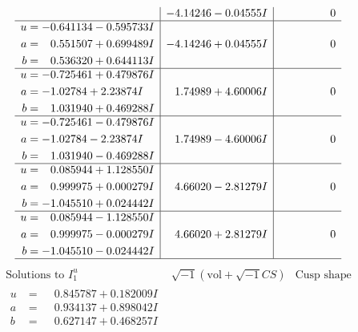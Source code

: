 \documentclass[1p]{elsarticle_modified}
\theoremstyle{definition}
\newcommand{\I}{\sqrt{-1}}
\begin{document}
$$\begin{array}{c|c|c}
 & -4.14246 - 0.04555 I & \phantom{-0.000000 } 0 \\ \hline\begin{aligned}
u &= -0.641134 - 0.595733 I \\
a &= \phantom{-}0.551507 + 0.699489 I \\
b &= \phantom{-}0.536320 + 0.644113 I\end{aligned}
 & -4.14246 + 0.04555 I & \phantom{-0.000000 } 0 \\ \hline\begin{aligned}
u &= -0.725461 + 0.479876 I \\
a &= -1.02784 + 2.23874 I \\
b &= \phantom{-}1.031940 + 0.469288 I\end{aligned}
 & \phantom{-}1.74989 + 4.60006 I & \phantom{-0.000000 } 0 \\ \hline\begin{aligned}
u &= -0.725461 - 0.479876 I \\
a &= -1.02784 - 2.23874 I \\
b &= \phantom{-}1.031940 - 0.469288 I\end{aligned}
 & \phantom{-}1.74989 - 4.60006 I & \phantom{-0.000000 } 0 \\ \hline\begin{aligned}
u &= \phantom{-}0.085944 + 1.128550 I \\
a &= \phantom{-}0.999975 + 0.000279 I \\
b &= -1.045510 + 0.024442 I\end{aligned}
 & \phantom{-}4.66020 - 2.81279 I & \phantom{-0.000000 } 0 \\ \hline\begin{aligned}
u &= \phantom{-}0.085944 - 1.128550 I \\
a &= \phantom{-}0.999975 - 0.000279 I \\
b &= -1.045510 - 0.024442 I\end{aligned}
 & \phantom{-}4.66020 + 2.81279 I & \phantom{-0.000000 } 0\\
 \hline 
 \end{array}$$\newpage$$\begin{array}{c|c|c}  
\text{Solutions to }I^u_{1}& \I (\text{vol} + \sqrt{-1}CS) & \text{Cusp shape}\\
 \hline 
\begin{aligned}
u &= \phantom{-}0.845787 + 0.182009 I \\
a &= \phantom{-}0.934137 + 0.898042 I \\
b &= \phantom{-}0.627147 + 0.468257 I\end{aligned}

\end{array}$$
\end{document}
